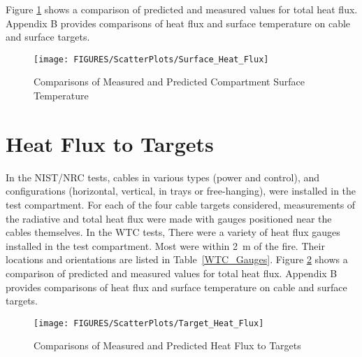 Figure \ref{fig:Surface_Flux_Scatter} shows a comparison of predicted and measured values for total heat flux. Appendix B provides comparisons of heat flux and surface temperature on cable and surface targets.  
\label{Target Heat Flux}

\begin{figure}
\begin{center}
\texttt{[image: FIGURES/ScatterPlots/Surface\_Heat\_Flux]}
\end{center}
\caption{Comparisons of Measured and Predicted Compartment Surface Temperature} \label{fig:Surface_Flux_Scatter}
\end{figure}


\section{Heat Flux to Targets}

In the NIST/NRC tests, cables in various types (power and control), and configurations (horizontal, vertical, in trays or free-hanging), were installed in the test compartment. For each of the four cable targets considered, measurements of the radiative and total heat flux were made with gauges positioned near the cables themselves.  In the WTC tests, There were a variety of heat flux gauges installed in the test compartment. Most were within 2~m of the fire. Their locations and orientations are listed in Table~\ref{WTC_Gauges}. Figure \ref{fig:Target_Flux_Scatter} shows a comparison of predicted and measured values for total heat flux. Appendix B provides comparisons of heat flux and surface temperature on cable and surface targets.  
\label{Surface Heat Flux}
\label{Wall Heat Flux}
\label{Ceiling Heat Flux}
\label{Floor Heat Flux}

\begin{figure}
\begin{center}
\texttt{[image: FIGURES/ScatterPlots/Target\_Heat\_Flux]}
\end{center}
\caption{Comparisons of Measured and Predicted Heat Flux to Targets} \label{fig:Target_Flux_Scatter}
\end{figure}

